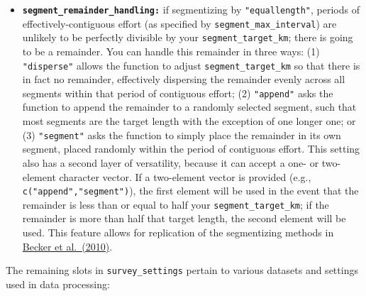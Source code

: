 \documentclass[
]{book}
\begin{document}
\begin{itemize}
\item
  \textbf{\texttt{segment\_remainder\_handling:}} if segmentizing by \texttt{"equallength"}, periods of effectively-contiguous effort (as specified by \texttt{segment\_max\_interval}) are unlikely to be perfectly divisible by your \texttt{segment\_target\_km}; there is going to be a remainder. You can handle this remainder in three ways: (1) \texttt{"disperse"} allows the function to adjust \texttt{segment\_target\_km} so that there is in fact no remainder, effectively dispersing the remainder evenly across all segments within that period of contiguous effort; (2) \texttt{"append"} asks the function to append the remainder to a randomly selected segment, such that most segments are the target length with the exception of one longer one; or (3) \texttt{"segment"} asks the function to simply place the remainder in its own segment, placed randomly within the period of contiguous effort. This setting also has a second layer of versatility, because it can accept a one- or two-element character vector. If a two-element vector is provided (e.g., \texttt{c("append","segment")}), the first element will be used in the event that the remainder is less than or equal to half your \texttt{segment\_target\_km}; if the remainder is more than half that target length, the second element will be used. This feature allows for replication of the segmentizing methods in \href{https://www.int-res.com/abstracts/meps/v413/p163-183/}{Becker et al.~(2010)}.
\end{itemize}

The remaining slots in \texttt{survey\_settings} pertain to various datasets and settings used in data processing:
\end{document}
